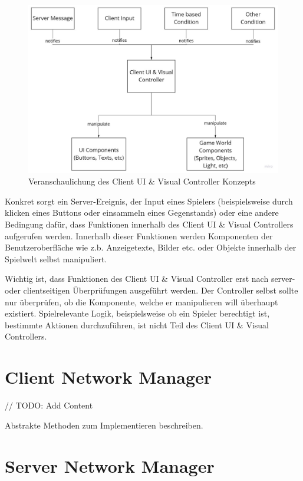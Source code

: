 \begin{figure}
	\centering
	\includegraphics[width=150mm]{images/Client_UI_und_Visual_Konzept.jpg}
	\caption[Client UI \& Visual Controller Diagramm]{Veranschaulichung des Client UI \& Visual Controller Konzepts}
	\label{pic:Client_UI_und_Visual_Konzept}
\end{figure}

Konkret sorgt ein Server-Ereignis, der Input eines Spielers (beispielsweise durch klicken eines Buttons oder einsammeln eines Gegenstands) oder eine andere Bedingung dafür, dass Funktionen innerhalb des Client UI \& Visual Controllers aufgerufen werden. Innerhalb dieser Funktionen werden Komponenten der Benutzeroberfläche wie z.b. Anzeigetexte, Bilder etc. oder Objekte innerhalb der Spielwelt selbst manipuliert.

Wichtig ist, dass Funktionen des Client UI \& Visual Controller erst nach server- oder clientseitigen Überprüfungen ausgeführt werden. Der Controller selbst sollte nur überprüfen, ob die Komponente, welche er manipulieren will überhaupt existiert. Spielrelevante Logik, beispielsweise ob ein Spieler berechtigt ist, bestimmte Aktionen durchzuführen, ist nicht Teil des Client UI \& Visual Controllers.

\section{Client Network Manager}

// TODO: Add Content

Abstrakte Methoden zum Implementieren beschreiben.

\section{Server Network Manager}

